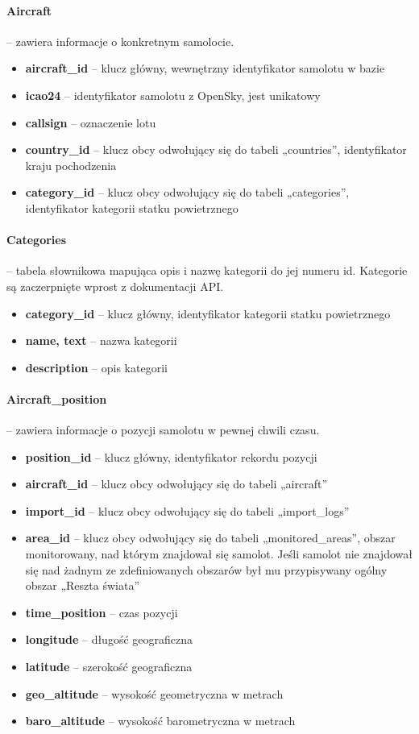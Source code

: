 \documentclass[12pt,a4paper]{article}
\begin{document}
\paragraph{Aircraft} – zawiera informacje o konkretnym samolocie.
\begin{itemize}
    \item \textbf{aircraft\_id} – klucz główny, wewnętrzny identyfikator samolotu w bazie
    \item \textbf{icao24} – identyfikator samolotu z OpenSky, jest unikatowy
    \item \textbf{callsign} – oznaczenie lotu
    \item \textbf{country\_id} – klucz obcy odwołujący się do tabeli „countries”, identyfikator kraju pochodzenia
    \item \textbf{category\_id} – klucz obcy odwołujący się do tabeli „categories”, identyfikator kategorii statku powietrznego
\end{itemize}

\paragraph{Categories} – tabela słownikowa mapująca opis i nazwę kategorii do jej numeru id. Kategorie są zaczerpnięte wprost z dokumentacji API.
\begin{itemize}
    \item \textbf{category\_id} – klucz główny, identyfikator kategorii statku powietrznego
    \item \textbf{name, text} – nazwa kategorii
    \item \textbf{description} – opis kategorii
\end{itemize}

\paragraph{Aircraft\_position} – zawiera informacje o pozycji samolotu w pewnej chwili czasu.
\begin{itemize}
    \item \textbf{position\_id} – klucz główny, identyfikator rekordu pozycji
    \item \textbf{aircraft\_id} – klucz obcy odwołujący się do tabeli „aircraft”
    \item \textbf{import\_id} – klucz obcy odwołujący się do tabeli „import\_logs”
    \item \textbf{area\_id} – klucz obcy odwołujący się do tabeli „monitored\_areas”, obszar monitorowany, nad którym znajdował się samolot. Jeśli samolot nie znajdował się nad żadnym ze zdefiniowanych obszarów był mu przypisywany ogólny obszar „Reszta świata”
    \item \textbf{time\_position} – czas pozycji
    \item \textbf{longitude} – długość geograficzna
    \item \textbf{latitude} – szerokość geograficzna
    \item \textbf{geo\_altitude} – wysokość geometryczna w metrach
    \item \textbf{baro\_altitude} – wysokość barometryczna w metrach
\end{itemize}
\end{document}
